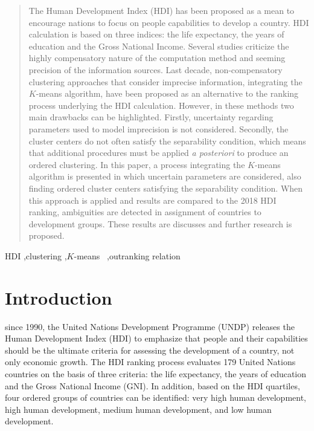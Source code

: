 \documentclass[]{elsarticle}
\theoremstyle{definition}
\begin{document}
\begin{frontmatter}
\begin{abstract}
The Human Development Index (HDI) has been proposed as a mean to encourage nations to focus on people capabilities to develop a country.  HDI calculation is based on three indices: the life expectancy, the years of education and the Gross National Income. Several studies criticize the highly compensatory nature of the computation method and seeming precision of the information sources. Last decade, non-compensatory clustering approaches that consider imprecise information, integrating the $K$-means algorithm,  have been proposed as an alternative to the ranking process underlying the HDI calculation. However, in these methods two main drawbacks can be highlighted. Firstly, uncertainty regarding parameters used to model imprecision is not considered. Secondly,  the cluster centers do not often satisfy the separability condition, which means that additional procedures must be applied \emph{a posteriori} to produce an ordered clustering. In this paper, a process integrating  the $K$-means algorithm is presented in which uncertain parameters are considered, also finding  ordered cluster centers satisfying the separability condition.  When this approach is applied and results are compared to the 2018 HDI ranking, ambiguities are detected in assignment of countries to development groups. These results are discusses and further research is proposed.
\end{abstract}

\begin{keyword}
HDI \sep clustering \sep $K$-means \ \sep outranking relation 
\end{keyword}

\end{frontmatter}


\section{Introduction}

since 1990, the United Nations Development Programme (UNDP) releases the Human Development Index (HDI) to emphasize that people and their capabilities should be the ultimate criteria for assessing the development of a country, not only economic growth. The HDI ranking process evaluates  179 United Nations countries on the basis of three criteria: the life expectancy, the years of education and the Gross National Income (GNI). In addition, based on the HDI quartiles, four ordered groups of countries can be identified: very high human development, high human development, medium human development, and low human development.  
\end{document}

